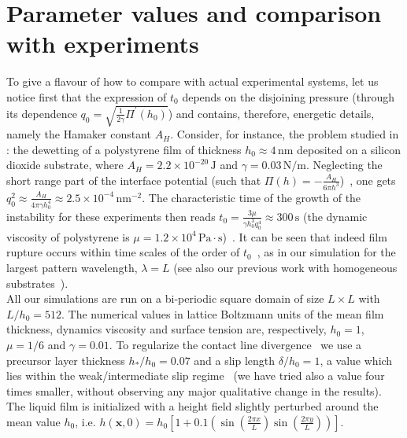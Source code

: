 \documentclass[amsmath,amssymb,showpacs,prl,superscriptaddress,notitlepage]{revtex4-1}
\begin{document}
\section{Parameter values and comparison with experiments}\label{sec:SMparam}

\noindent To give a flavour of how to compare with actual experimental systems, let us notice
first that the expression of $t_0$ depends on the disjoining pressure (through its dependence 
 $q_0 = \sqrt{\frac{1}{2\gamma} \Pi^{\prime}(h_0)}$) and contains, therefore, energetic details, namely 
 the Hamaker constant $A_H$. Consider, for instance, the problem studied in \cite{becker2003complex}: the dewetting of a polystyrene film of thickness $h_0 \approx 4 \, \text{nm}$ deposited on a silicon 
dioxide substrate, where $A_H  = 2.2 \times 10^{-20} \, \text{J}$ and 
$\gamma = 0.03 \, \text{N}/\text{m}$. Neglecting the short range part of the interface potential
(such that $\Pi(h)= - \frac{A_H}{6\pi h^3}$)~\cite{Mecke_2005,becker2003complex}, one gets 
$q_0^2 \approx \frac{A_H}{4\pi \gamma h_0^4} \approx 2.5 \times 10^{-4} \, \text{nm}^{-2}$.
The characteristic time of the growth of the instability for these experiments then reads $t_0 = \frac{3\mu}{\gamma h_0^3 q_0^4} \approx 300 \, \text{s}$ (the dynamic viscosity of polystyrene is 
$\mu = 1.2 \times 10^4 \, \text{Pa} \cdot \text{s}$)~\cite{PhysRevLett.99.114503}. It can be seen that indeed film rupture occurs within time 
scales of the order of $t_0$~\cite{becker2003complex}, as in our 
simulation for the largest pattern wavelength, $\lambda = L$ (see also our previous work
with homogeneous substrates~\cite{PhysRevE.104.034801}).\\
All our simulations are run on a bi-periodic square domain of size $L \times L$ with 
$L/h_0 = 512 $. The numerical values in lattice Boltzmann units of the 
mean film thickness, dynamics viscosity and surface tension are, respectively, $h_0=1$, $\mu=1/6$
and $\gamma=0.01$.
To regularize the contact line divergence~\cite{huh1971hydrodynamic}
we use a precursor layer thickness $h_{\ast}/h_0=0.07$ and a slip length $\delta/h_0 = 1$, 
a value which lies within the weak/intermediate slip regime~\cite{peschka2019signatures,fetzer2007quantifying, munch2005lubrication}
(we have tried also a value four times smaller, without observing any major qualitative change in the results).
The liquid film is initialized with a height field slightly perturbed around the mean value $h_0$,
i.e. $h(\mathbf{x},0) = h_0 \left[1 + 0.1 \left(\sin\left(\frac{2\pi x}{L}\right)\sin\left(\frac{2\pi y}{L}\right)\right)\right]$.
\end{document}
